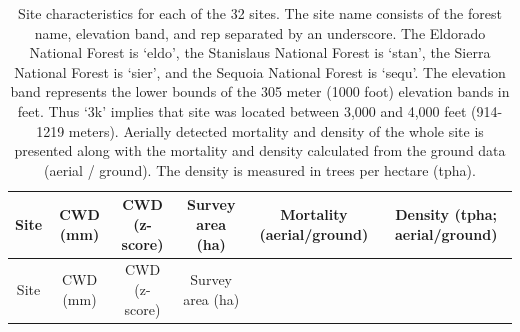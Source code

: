 \documentclass[]{article}
\begin{document}
\begin{longtable}[]{@{}cccccc@{}}
\caption{Site characteristics for each of the 32 sites. The site name
consists of the forest name, elevation band, and rep separated by an
underscore. The Eldorado National Forest is `eldo', the Stanislaus
National Forest is `stan', the Sierra National Forest is `sier', and the
Sequoia National Forest is `sequ'. The elevation band represents the
lower bounds of the 305 meter (1000 foot) elevation bands in feet. Thus
`3k' implies that site was located between 3,000 and 4,000 feet
(914-1219 meters). Aerially detected mortality and density of the whole
site is presented along with the mortality and density calculated from
the ground data (aerial / ground). The density is measured in trees per
hectare (tpha).}\tabularnewline
\toprule
\begin{minipage}[b]{0.12\columnwidth}\centering\strut
Site\strut
\end{minipage} & \begin{minipage}[b]{0.07\columnwidth}\centering\strut
CWD (mm)\strut
\end{minipage} & \begin{minipage}[b]{0.12\columnwidth}\centering\strut
CWD (z-score)\strut
\end{minipage} & \begin{minipage}[b]{0.14\columnwidth}\centering\strut
Survey area (ha)\strut
\end{minipage} & \begin{minipage}[b]{0.17\columnwidth}\centering\strut
Mortality (aerial/ground)\strut
\end{minipage} & \begin{minipage}[b]{0.22\columnwidth}\centering\strut
Density (tpha; aerial/ground)\strut
\end{minipage}\tabularnewline
\midrule
\endfirsthead
\toprule
\begin{minipage}[b]{0.12\columnwidth}\centering\strut
Site\strut
\end{minipage} & \begin{minipage}[b]{0.07\columnwidth}\centering\strut
CWD (mm)\strut
\end{minipage} & \begin{minipage}[b]{0.12\columnwidth}\centering\strut
CWD (z-score)\strut
\end{minipage} & \begin{minipage}[b]{0.14\columnwidth}\centering\strut
Survey area (ha)\strut
\end{minipage} & \begin{minipage}[b]{0.17\columnwidth}\centering\strut

\end{minipage}
\end{longtable}
\end{document}
